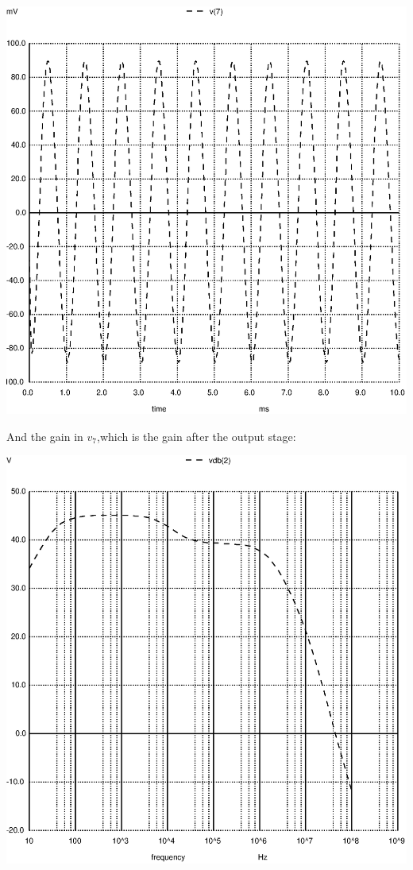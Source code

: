 \includegraphics[width=1\linewidth]{../sim/vo1.ps}

And the gain in $v_7$,which is the gain after the output stage:

\includegraphics[width=1\linewidth]{../sim/vo1f.ps}

